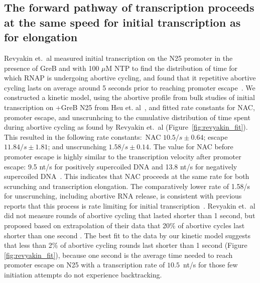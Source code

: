 %
\subsection{The forward pathway of transcription proceeds at the same speed
for initial transcription as for elongation}
Revyakin et.\ al measured initial transcription on the N25
promoter in the presence of GreB and with 100 $\mu$M NTP to find the
distribution of time for which RNAP is undergoing abortive cycling, and found
that it repetitive abortive cycling lasts on average around 5 seconds prior to
reaching promoter escape~\cite{revyakin_abortive_2006}. We constructed a
kinetic model, using the abortive profile from bulk studies of
initial transcription on +GreB N25 from Hsu et. al~\cite{hsu_initial_2006},
and fitted rate constants for NAC, promoter escape, and unscrunhcing to the
cumulative distribution of time spent during abortive cycling as found by
Revyakin et.\ al (Figure~\ref{fig:revyakin_fit}). This resulted in the
following rate constants:~NAC $10.5/s \pm 0.64$; escape $11.84/s \pm 1.81$;
and unscrunching $1.58/s \pm 0.14$. The value for NAC before promoter escape
is highly similar to the transcription velocity after promoter escape: 9.5
nt/s for positively supercoiled DNA and 13.8 nt/s for negatively supercoiled
DNA~\cite{revyakin_abortive_2006}. This indicates that NAC proceeds at the
same rate for both scrunching and transcription elongation. The comparatively
lower rate of 1.58/s for unscrunching, including abortive RNA release, is
consistent with previous reports that this process is rate limiting for
initial transcription~\cite{margeat_direct_2006, revyakin_abortive_2006}.
Revyakin et.\ al did not measure rounds of abortive cycling that lasted
shorter than 1 second, but proposed based on extrapolation of their data that
20\% of abortive cycles last shorter than one second
\cite{revyakin_abortive_2006}. The best fit to the data by our kinetic model
suggests that less than 2\% of abortive cycling rounds last shorter than 1
second (Figure \ref{fig:revyakin_fit}), because one second is the average time
needed to reach promoter escape on N25 with a transcription rate of
$10.5$~nt/s for those few initiation attempts do not experience backtracking.


